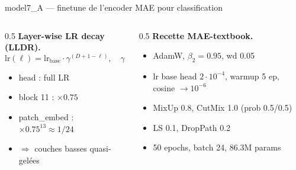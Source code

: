 \documentclass[10pt,aspectratio=169]{beamer}
\begin{document}
\begin{frame}{model7\_A --- finetune de l'encoder MAE pour classification}
  \vspace{4mm}
  \begin{columns}
    \begin{column}{0.5\textwidth}
      \footnotesize
      \textbf{Layer-wise LR decay (LLDR).}
      \[ \text{lr}(\ell) = \text{lr}_{\text{base}} \cdot \gamma^{(D+1-\ell)},\quad \gamma=0.75 \]
      \begin{itemize}
        \item head : full LR
        \item block 11 : $\times 0.75$
        \item patch\_embed : $\times 0.75^{13} \approx 1/24$
        \item $\Rightarrow$ couches basses quasi-gelées
      \end{itemize}
    \end{column}
    \begin{column}{0.5\textwidth}
      \footnotesize
      \textbf{Recette MAE-textbook.}
      \begin{itemize}
        \item AdamW, $\beta_2{=}0.95$, wd 0.05
        \item lr base head $2\!\cdot\!10^{-4}$, warmup 5 ep, cosine $\to 10^{-6}$
        \item MixUp 0.8, CutMix 1.0 (prob 0.5/0.5)
        \item LS 0.1, DropPath 0.2
        \item 50 epochs, batch 24, 86.3M params
      \end{itemize}
    \end{column}
  \end{columns}
\end{frame}
\end{document}
